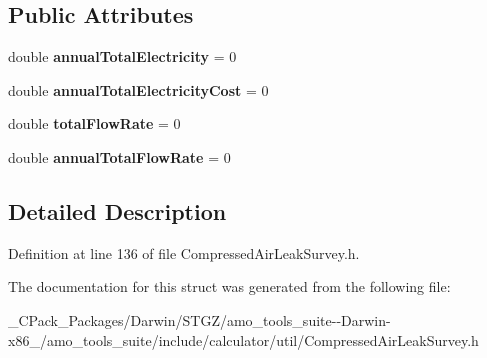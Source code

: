 \subsection*{Public Attributes}
\begin{DoxyCompactItemize}
\item 
\mbox{\label{struct_compressed_air_leak_survey_1_1_output_a399aea730852cc50e5878f7c470c4d9c}} 
double {\bfseries annual\+Total\+Electricity} = 0
\item 
\mbox{\label{struct_compressed_air_leak_survey_1_1_output_a68c3284d74f866567b21fa81766eaaa7}} 
double {\bfseries annual\+Total\+Electricity\+Cost} = 0
\item 
\mbox{\label{struct_compressed_air_leak_survey_1_1_output_a95b2116b03369daf516b8bed18f15a81}} 
double {\bfseries total\+Flow\+Rate} = 0
\item 
\mbox{\label{struct_compressed_air_leak_survey_1_1_output_aca3852a0ac4d78c8eaf7920fdf159cae}} 
double {\bfseries annual\+Total\+Flow\+Rate} = 0
\end{DoxyCompactItemize}


\subsection{Detailed Description}


Definition at line 136 of file Compressed\+Air\+Leak\+Survey.\+h.



The documentation for this struct was generated from the following file\+:\begin{DoxyCompactItemize}
\item 
\+\_\+\+C\+Pack\+\_\+\+Packages/\+Darwin/\+S\+T\+G\+Z/amo\+\_\+tools\+\_\+suite-\/-\/\+Darwin-\/x86\+\_/amo\+\_\+tools\+\_\+suite/include/calculator/util/Compressed\+Air\+Leak\+Survey.\+h\end{DoxyCompactItemize}

